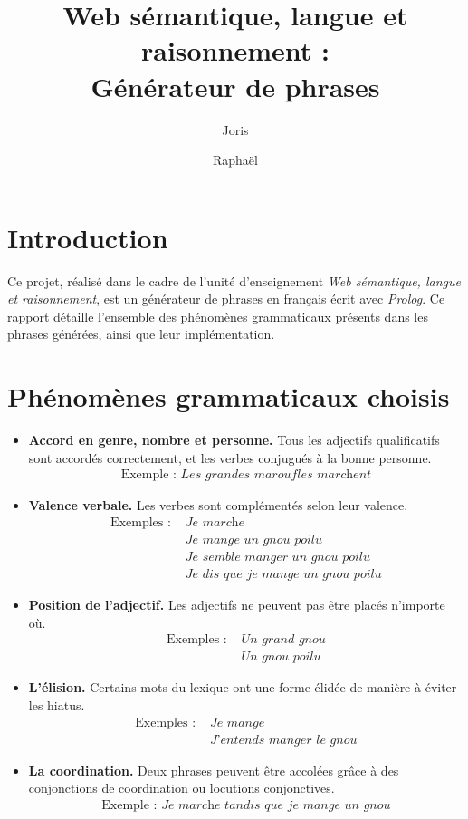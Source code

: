 \documentclass[a4paper,10pt]{article}
\title{
	\textbf{Web sémantique, langue et raisonnement :\\
          Générateur de phrases} }
\author{
	Joris \Nom{Pablo} \and Raphaël \Nom{Gaudy} }
\newcommand\Terme\textit
\begin{document}
\maketitle

\section*{Introduction}
Ce projet, réalisé dans le cadre de l'unité d'enseignement \Terme{Web sémantique, langue et raisonnement}, est un générateur de phrases en français écrit avec \Terme{Prolog}. Ce rapport détaille l'ensemble des phénomènes grammaticaux présents dans les phrases générées, ainsi que leur implémentation.

\section{Phénomènes grammaticaux choisis}
\begin{itemize}
\item \textbf{Accord en genre, nombre et personne.} Tous les adjectifs qualificatifs sont accordés correctement, et les verbes conjugués à la bonne personne. 
  \begin{align*}
    \text{Exemple :~} \textit{Les grandes maroufles marchent}
  \end{align*}

\item \textbf{Valence verbale.} Les verbes sont complémentés selon leur valence. 
  \begin{align*}
    \text{Exemples :~} 
    &\textit{Je marche}\\
    &\textit{Je mange un gnou poilu}\\
    &\textit{Je semble manger un gnou poilu}\\
    &\textit{Je dis que je mange un gnou poilu}
  \end{align*}

\item \textbf{Position de l'adjectif.} Les adjectifs ne peuvent pas être placés n'importe où.
  \begin{align*}
    \text{Exemples :~}
    &\textit{Un grand gnou}\\
    &\textit{Un gnou poilu}
  \end{align*}

\item \textbf{L'élision.} Certains mots du lexique ont une forme élidée de manière à éviter les hiatus.
\begin{align*}
  \text{Exemples :~}
  &\textit{Je mange}\\
  &\textit{J'entends manger le gnou}
\end{align*}

\item \textbf{La coordination.} Deux phrases peuvent être accolées grâce à des conjonctions de coordination ou locutions conjonctives.
\begin{align*}
\text{Exemple :~}
\textit{Je marche tandis que je mange un gnou}
\end{align*}
\end{itemize}
\end{document}
